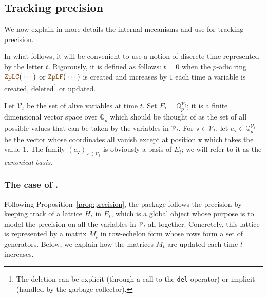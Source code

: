 \documentclass[sigconf]{acmart}
\newcommand{\Z}{\mathbb Z}
\newcommand{\Zp}{\Z_p}
\newcommand{\Q}{\mathbb Q}
\newcommand{\Qp}{\Q_p}
\newcommand{\calV}{\mathcal{V}}
\newcommand{\ttv}{\texttt{v}\xspace}
\newcommand{\ZpLC}{\text{\color{output} \rm \tt ZpLC}\xspace}
\newcommand{\ZpLF}{\text{\color{output} \rm \tt ZpLF}\xspace}
\newtheorem{prop}[theo]{Proposition}
\theoremstyle{definition}
\begin{document}
%

\subsection{Tracking precision}
\label{ssec:trackprec}

We now explain in more details the internal mecanisms \ZpLC and \ZpLF 
use for tracking precision. 

In what follows, it will be convenient to use a notion of discrete time 
represented by the letter $t$. Rigorously, it is defined as follows: 
$t=0$ when the $p$-adic ring $\ZpLC(\:\cdots)$ or $\ZpLF(\:\cdots)$ is 
created and increases by $1$ each time a variable is created, 
deleted\footnote{The deletion can be explicit (through a call to the 
\texttt{del} operator) or implicit (handled by the garbage collector).} 
or updated.

Let $\calV_t$ be the set of alive variables at time $t$. Set $E_t = 
\Qp^{\calV_t}$; it is a finite dimensional vector space over $\Qp$ which 
should be thought of as the set of all possible values that can be taken by 
the variables in $\calV_t$. For $\ttv \in \calV_t$, let $e_\ttv \in
\Qp^{\calV_t}$ be the vector whose coordinates all vanish except 
at position $\ttv$ which takes the value $1$. The family 
$(e_\ttv)_{\ttv \in \calV_t}$ is obviously a basis of $E_t$; we will 
refer to it as the \emph{canonical basis}.

\subsubsection{The case of \ZpLC.}

Following Proposition~\ref{prop:precision},
the package \ZpLC follows the precision by keeping track of a lattice
$H_t$ in $E_t$, which is a global object whose purpose is to model the 
precision on all the variables in $\calV_t$ all together.
Concretely, this lattice is represented by a matrix $M_t$ in row-echelon 
form whose rows form a set of generators.
Below, we explain how the matrices $M_t$ are updated each time
$t$ increases.
\end{document}
